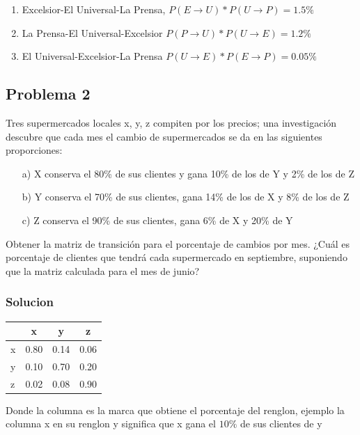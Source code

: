 \documentclass{article}
\begin{document}
\begin{enumerate}
    \item Excelsior-El Universal-La Prensa, $P(E \rightarrow U) * P(U \rightarrow P) = 1.5\%$
    \item La Prensa-El Universal-Excelsior $P(P \rightarrow U) * P(U \rightarrow E) = 1.2\%$
    \item El Universal-Excelsior-La Prensa $P(U \rightarrow E) * P(E \rightarrow P) = 0.05\%$
\end{enumerate}

\subsection*{Problema 2}

Tres supermercados locales x, y, z compiten por los precios; una investigación descubre que cada mes el cambio de supermercados se da en las siguientes proporciones:
\begin{itemize}
    \item[a)] X conserva el 80\% de sus clientes y gana 10\% de los de Y y 2\% de los de Z
    \item[b)] Y conserva el 70\% de sus clientes, gana 14\% de los de X y 8\% de los de Z
    \item[c)] Z conserva el 90\% de sus clientes, gana 6\% de X y 20\% de Y
\end{itemize}

Obtener la matriz de transición para el porcentaje de cambios por mes. ¿Cuál es porcentaje de clientes que tendrá cada supermercado en septiembre, suponiendo que la matriz calculada para el mes de junio?

\subsubsection*{Solucion}

\begin{table}[ht]
    \centering
    \begin{tabular}{|l|c c c|}
        \hline
          & x    & y    & z    \\ \hline
        x & 0.80 & 0.14 & 0.06 \\
        y & 0.10 & 0.70 & 0.20 \\
        z & 0.02 & 0.08 & 0.90 \\
        \hline
    \end{tabular}
\end{table}

Donde la columna es la marca que obtiene el porcentaje del renglon, ejemplo la columna x en su renglon y significa que x gana el $10\%$ de sus clientes de y
\end{document}
